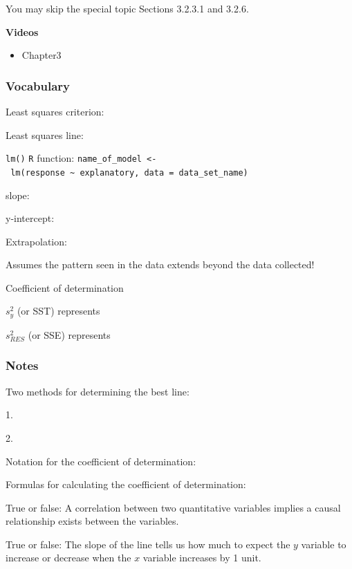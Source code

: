 \documentclass[
]{report}
\providecommand{\tightlist}{%
  \setlength{\itemsep}{0pt}\setlength{\parskip}{0pt}}
\newcommand{\rgs}{\vspace{12pt}} %
\newcommand{\rgi}{\hspace{24pt}}  %
\begin{document}
You may skip the special topic Sections 3.2.3.1 and 3.2.6.

\textbf{Videos}

\begin{itemize}
\tightlist
\item
  Chapter3
\end{itemize}


\hypertarget{vocabulary-7}{%
\subsubsection*{Vocabulary}\label{vocabulary-7}}

Least squares criterion:
\rgs

Least squares line:
\rgs

\texttt{lm()} \texttt{R} function:
\rgi \texttt{name\_of\_model\ \textless{}-\ lm(response\ \textasciitilde{}\ explanatory,\ data\ =\ data\_set\_name)}

\rgs

slope:
\rgs

y-intercept:\\
\rgs

Extrapolation:

\rgi Assumes the pattern seen in the data extends beyond the data collected!

Coefficient of determination

\rgi \(s_y^2\) (or SST) represents
\rgs

\rgi \(s_{RES}^2\) (or SSE) represents
\rgs

\hypertarget{notes-9}{%
\subsubsection*{Notes}\label{notes-9}}

Two methods for determining the best line:

\rgi 1.
\rgs

\rgi 2.
\rgs

Notation for the coefficient of determination:
\rgs

Formulas for calculating the coefficient of determination:
\rgs

True or false: A correlation between two quantitative variables implies a causal relationship exists between the variables.

True or false: The slope of the line tells us how much to expect the \(y\) variable to increase or decrease when the \(x\) variable increases by 1 unit.
\end{document}
